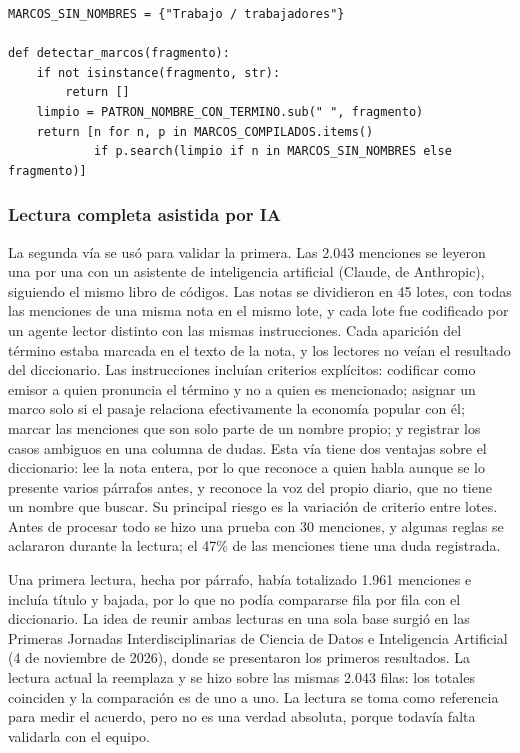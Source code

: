 \documentclass[11pt,a4paper]{article}
\newcommand{\EP}{economía popular}
\begin{document}
\begin{lstlisting}[caption={Corrección de la detección de marcos.}, label=cod:marcos]
MARCOS_SIN_NOMBRES = {"Trabajo / trabajadores"}

def detectar_marcos(fragmento):
    if not isinstance(fragmento, str):
        return []
    limpio = PATRON_NOMBRE_CON_TERMINO.sub(" ", fragmento)
    return [n for n, p in MARCOS_COMPILADOS.items()
            if p.search(limpio if n in MARCOS_SIN_NOMBRES else fragmento)]
\end{lstlisting}

\subsubsection{Lectura completa asistida por IA}
\label{sec:lectura-ia}

La segunda vía se usó para validar la primera. Las 2.043 menciones se leyeron una por una con un asistente de inteligencia artificial (Claude, de Anthropic), siguiendo el mismo libro de códigos. Las notas se dividieron en 45 lotes, con todas las menciones de una misma nota en el mismo lote, y cada lote fue codificado por un agente lector distinto con las mismas instrucciones. Cada aparición del término estaba marcada en el texto de la nota, y los lectores no veían el resultado del diccionario. Las instrucciones incluían criterios explícitos: codificar como emisor a quien pronuncia el término y no a quien es mencionado; asignar un marco solo si el pasaje relaciona efectivamente la \EP{} con él; marcar las menciones que son solo parte de un nombre propio; y registrar los casos ambiguos en una columna de dudas. Esta vía tiene dos ventajas sobre el diccionario: lee la nota entera, por lo que reconoce a quien habla aunque se lo presente varios párrafos antes, y reconoce la voz del propio diario, que no tiene un nombre que buscar. Su principal riesgo es la variación de criterio entre lotes. Antes de procesar todo se hizo una prueba con 30 menciones, y algunas reglas se aclararon durante la lectura; el 47\% de las menciones tiene una duda registrada.

Una primera lectura, hecha por párrafo, había totalizado 1.961 menciones e incluía título y bajada, por lo que no podía compararse fila por fila con el diccionario. La idea de reunir ambas lecturas en una sola base surgió en las Primeras Jornadas Interdisciplinarias de Ciencia de Datos e Inteligencia Artificial (4 de noviembre de 2026), donde se presentaron los primeros resultados. La lectura actual la reemplaza y se hizo sobre las mismas 2.043 filas: los totales coinciden y la comparación es de uno a uno. La lectura se toma como referencia para medir el acuerdo, pero no es una verdad absoluta, porque todavía falta validarla con el equipo.
\end{document}
